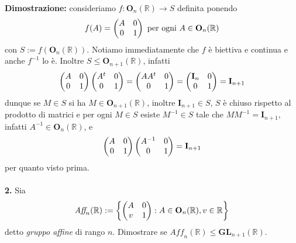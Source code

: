 \documentclass{article}
\begin{document}
\textbf{Dimostrazione:} consideriamo $f : \mathbf{O}_n(\mathbb{R}) \longrightarrow S$ definita ponendo
\begin{gather}
    f(A) = \begin{pmatrix}
        A & 0 \\
        0 & 1
    \end{pmatrix} \text{ per ogni } A \in \mathbf{O}_n(\mathbb{R}) \notag
\end{gather}
con $S := f(\mathbf{O}_n(\mathbb{R}))$. Notiamo immediatamente che $f$ è biettiva e continua e anche $f^{-1}$ lo è. Inoltre $S \leq \mathbf{O}_{n + 1}(\mathbb{R})$, infatti
\begin{gather}
    \begin{pmatrix}
        A & 0 \\
        0 & 1
    \end{pmatrix}
    \begin{pmatrix}
        A^t & 0 \\
        0 & 1
    \end{pmatrix} = 
    \begin{pmatrix}
        AA^t & 0 \\
        0 & 1
    \end{pmatrix} = 
    \begin{pmatrix}
        \mathbf{I}_n & 0 \\
        0 & 1
    \end{pmatrix} = \mathbf{I}_{n + 1} \notag
\end{gather}
dunque se $M \in S$ si ha $M \in \mathbf{O}_{n + 1}(\mathbb{R})$, inoltre $\mathbf{I}_{n + 1} \in S$, $S$ è chiuso rispetto al prodotto di matrici e per ogni $M \in S$ esiste $M^{-1} \in S$ tale che $MM^{-1} = \mathbf{I}_{n + 1}$, infatti $A^{-1} \in \mathbf{O}_n(\mathbb{R})$, e
\begin{gather}
    \begin{pmatrix}
        A & 0 \\
        0 & 1
    \end{pmatrix}
    \begin{pmatrix}
        A^{-1} & 0 \\
        0 & 1
    \end{pmatrix} = 
    \mathbf{I}_{n + 1} \notag
\end{gather}
per quanto visto prima. \\ \\
\textbf{2.} Sia
\begin{gather}
    \textit{Aff}_n(\mathbb{R}) := \left\{ \begin{pmatrix}
        A & 0 \\
        v & 1
    \end{pmatrix} : A \in \mathbf{O}_n(\mathbb{R}), v \in \mathbb{R} \right\} \notag
\end{gather}
detto \textit{gruppo affine} di rango $n$. Dimostrare se $\textit{Aff}_n(\mathbb{R}) \leq \mathbf{GL}_{n + 1}(\mathbb{R})$. \\
\end{document}
